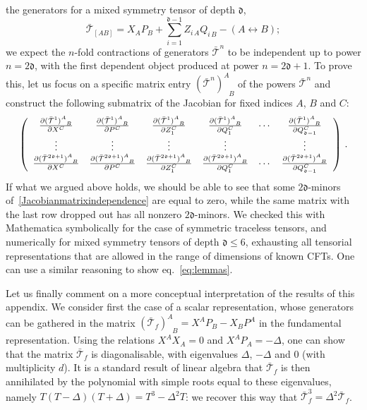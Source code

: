 \documentclass{article}
\def\dep{\mathfrak{d}}
\begin{document}
the generators for a mixed symmetry tensor of depth $\dep$, 
\begin{equation}
     \bar{\mathcal{T}}_{[AB]}=X_A P_B+\sum_{i=1}^{\dep-1} Z_{i\,A}Q_{i\,B} - (A\leftrightarrow B);
\end{equation}
we expect the $n$-fold contractions of generators $ \bar{\mathcal{T}}^n$ to be independent up to 
power $n=2\dep$, with the first dependent object produced at power $n=2\dep+1$. To prove this, let 
us focus on a specific matrix entry $( \bar{\mathcal{T}}^n)^{A}_{\;\;\,B} $ of the powers $\bar{\mathcal{T}}^n$ and construct the following submatrix of the Jacobian for fixed indices $A$, $B$ and $C$:
\begin{equation}
    \left(
    \begin{array}{cccccc}
    \pdv{{( \bar{\mathcal{T}}^1)}^{A}_{\;\;\,B} }{X^C}     & \pdv{{( \bar{\mathcal{T}}^1)}^{A}_{\;\;\,B} }{P^C} & \pdv{{( \bar{\mathcal{T}}^1)}^{A}_{\;\;\,B} }{Z_1^C} & \pdv{{( \bar{\mathcal{T}}^1)}^{A}_{\;\;\,B} }{Q_1^C} & \cdots & \pdv{{( \bar{\mathcal{T}}^1)}^{A}_{\;\;\,B} }{Q_{\dep-1}^C}\\
        \vdots &\vdots & \vdots &\vdots & &\vdots \\
    \pdv{{( \bar{\mathcal{T}}^{2\dep+1})}^{A}_{\;\;\,B} }{X^C}     & \pdv{{( \bar{\mathcal{T}}^{2\dep+1})}^{A}_{\;\;\,B} }{P^C} & \pdv{{( \bar{\mathcal{T}}^{2\dep+1})}^{A}_{\;\;\,B} }{Z_1^C} & \pdv{{( \bar{\mathcal{T}}^{2\dep+1})}^{A}_{\;\;\,B} }{Q_1^C} & \cdots & \pdv{{(\bar{\mathcal{T}}^{2\dep+1})}^{A}_{\;\;\,B}}{Q_{\dep-1}^C}
    \end{array}
    \right)\,.
    \label{Jacobianmatrixindependence}
\end{equation}
If what we argued above holds, we should be able to see that some $2\dep$-minors 
of~\eqref{Jacobianmatrixindependence} are equal to zero, while the same matrix with the last 
row dropped out has all nonzero $2\dep$-minors. We checked this with Mathematica symbolically 
for the case of symmetric traceless tensors, and numerically for mixed symmetry tensors of 
depth $\dep \le 6$, exhausting all tensorial representations that are allowed in the range 
of dimensions of known CFTs. One can use a similar reasoning to show eq.\ \eqref{eq:lemmas}. 

Let us finally comment on a more conceptual interpretation of the results of this appendix. We consider first the case of a scalar representation, whose generators can be gathered in the matrix $ (\bar{\mathcal{T}}_f)^{A}_{\;\;\,B} = X^A P_B-X_B P^A$ in the fundamental representation. Using the relations $X^A X_A=0$ and $X^A P_A = -\Delta$, one can show that the matrix $\bar{\mathcal{T}}_f$ is diagonalisable, with eigenvalues $\Delta$, $-\Delta$ and $0$ (with multiplicity $d$). It is a standard result of linear algebra that $\bar{\mathcal{T}}_f$ is then annihilated by the polynomial with simple roots equal to these eigenvalues, namely $T(T-\Delta)(T+\Delta)=T^3-\Delta^2T$: we recover this way that $\bar{\mathcal{T}}_f^3 = \Delta^2 \bar{\mathcal{T}}_f$.  
\end{document}
